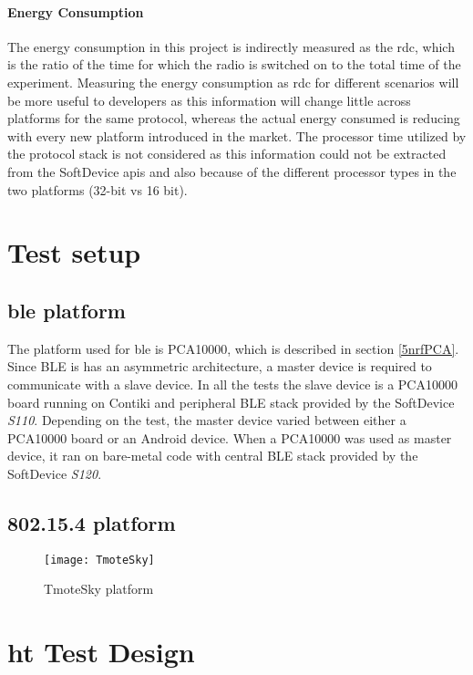 \paragraph{Energy Consumption}
The energy consumption in this project is indirectly measured as the \acrfull{rdc}, which is the ratio of the time for which the radio is switched on to the total time of the experiment. Measuring the energy consumption as \gls{rdc} for different scenarios will be more useful to developers as this information will change little across platforms for the same protocol, whereas the actual energy consumed is reducing with every new platform introduced in the market. The processor time utilized by the protocol stack is not considered as this information could not be extracted from the SoftDevice \glspl{api} and also because of the different processor types in the two platforms (32-bit vs 16 bit). 

\section{Test setup} \label{6TestPlatforms}

\subsection{\gls{ble} platform}
The platform used for \gls{ble} is PCA10000, which is described in section \ref{5nrfPCA}. Since BLE is has an asymmetric architecture, a master device is required to communicate with a slave device. In all the tests the slave device is a PCA10000 board running on Contiki and peripheral BLE stack provided by the SoftDevice \emph{S110}. Depending on the test, the master device varied between either a PCA10000 board or an Android device. When a PCA10000 was used as master device, it ran on bare-metal code with central BLE stack provided by the SoftDevice \emph{S120}.

\subsection{802.15.4 platform}

\begin{figure}[h]
    \centering
    \texttt{[image: TmoteSky]}
	\caption{TmoteSky platform}
    \label{fig:TmoteSky}
\end{figure}


\section{\acrfull{ht} Test Design} \label{6HTdesign}

